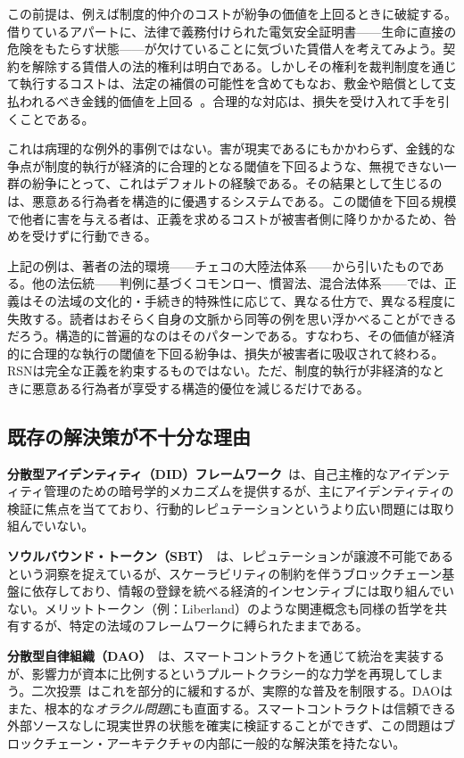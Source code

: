 \documentclass[11pt,a4paper,twocolumn]{article}
\begin{document}
この前提は、例えば制度的仲介のコストが紛争の価値を上回るときに破綻する。借りているアパートに、法律で義務付けられた電気安全証明書——生命に直接の危険をもたらす状態——が欠けていることに気づいた賃借人を考えてみよう。契約を解除する賃借人の法的権利は明白である。しかしその権利を裁判制度を通じて執行するコストは、法定の補償の可能性を含めてもなお、敷金や賠償として支払われるべき金銭的価値を上回る~\cite{czcourtfees}。合理的な対応は、損失を受け入れて手を引くことである。

これは病理的な例外的事例ではない。害が現実であるにもかかわらず、金銭的な争点が制度的執行が経済的に合理的となる閾値を下回るような、無視できない一群の紛争にとって、これはデフォルトの経験である。その結果として生じるのは、悪意ある行為者を構造的に優遇するシステムである。この閾値を下回る規模で他者に害を与える者は、正義を求めるコストが被害者側に降りかかるため、咎めを受けずに行動できる。

上記の例は、著者の法的環境——チェコの大陸法体系——から引いたものである。他の法伝統——判例に基づくコモンロー、慣習法、混合法体系——では、正義はその法域の文化的・手続き的特殊性に応じて、異なる仕方で、異なる程度に失敗する。読者はおそらく自身の文脈から同等の例を思い浮かべることができるだろう。構造的に普遍的なのはそのパターンである。すなわち、その価値が経済的に合理的な執行の閾値を下回る紛争は、損失が被害者に吸収されて終わる。RSNは完全な正義を約束するものではない。ただ、制度的執行が非経済的なときに悪意ある行為者が享受する構造的優位を減じるだけである。

\subsection{既存の解決策が不十分な理由}

\textbf{分散型アイデンティティ（DID）フレームワーク}~\cite{did2022}は、自己主権的なアイデンティティ管理のための暗号学的メカニズムを提供するが、主にアイデンティティの検証に焦点を当てており、行動的レピュテーションというより広い問題には取り組んでいない。

\textbf{ソウルバウンド・トークン（SBT）}~\cite{weyl2022}は、レピュテーションが譲渡不可能であるという洞察を捉えているが、スケーラビリティの制約を伴うブロックチェーン基盤に依存しており、情報の登録を統べる経済的インセンティブには取り組んでいない。メリットトークン（例：Liberland）のような関連概念も同様の哲学を共有するが、特定の法域のフレームワークに縛られたままである。

\textbf{分散型自律組織（DAO）}~\cite{buterin2014}は、スマートコントラクトを通じて統治を実装するが、影響力が資本に比例するというプルートクラシー的な力学を再現してしまう。二次投票~\cite{buterin2019}はこれを部分的に緩和するが、実際的な普及を制限する。DAOはまた、根本的な\emph{オラクル問題}にも直面する。スマートコントラクトは信頼できる外部ソースなしに現実世界の状態を確実に検証することができず、この問題はブロックチェーン・アーキテクチャの内部に一般的な解決策を持たない。
\end{document}
